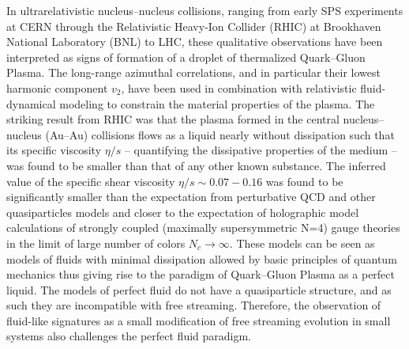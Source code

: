 \documentclass[../report.tex]{subfiles}
\begin{document}
In ultrarelativistic nucleus--nucleus collisions, ranging from early SPS experiments at CERN through the Relativistic Heavy-Ion Collider (RHIC) at Brookhaven National Laboratory (BNL) to LHC, these qualitative observations have been interpreted as signs of formation of a droplet of thermalized Quark--Gluon Plasma. The long-range azimuthal correlations, and in particular their lowest harmonic component $v_2$, have been used in combination with relativistic fluid-dynamical modeling to constrain the material properties of the plasma.  The striking result from RHIC was that the plasma formed in the central nucleus--nucleus (Au--Au) collisions flows as a liquid nearly without dissipation such that its specific viscosity $\eta/s$ -- quantifying the dissipative properties of the medium -- was found to be smaller than that of any other known substance. The inferred value of the specific shear viscosity $\eta/s\sim 0.07-0.16$ \cite{} was found to be significantly smaller than the expectation from perturbative QCD and other quasiparticles models and closer to the expectation of holographic model calculations of strongly coupled (maximally supersymmetric N=4) gauge theories in the limit of large number of colors $N_c \rightarrow \infty$. These models can be seen as models of fluids with minimal dissipation allowed by basic principles of quantum mechanics thus giving rise to the paradigm of Quark--Gluon Plasma as a perfect liquid. The models of perfect fluid do not have a quasiparticle structure, and as such they are incompatible with free streaming. Therefore, the observation of fluid-like signatures as a small modification of free streaming evolution in small systems also challenges the perfect fluid paradigm. 
\end{document}
